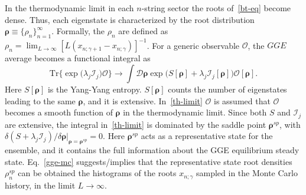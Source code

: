 \documentclass[twocolumn,superscriptaddress,prb,10pt]{revtex4-1}
\begin{document}
In the thermodynamic limit in each $n$-string sector the roots of~\eqref{bt-eq} become 
dense. Thus, each eigenstate is characterized by the root distribution $\pmb{\rho}\equiv
\{\rho_n\}_{n=1}^\infty$. Formally, the $\rho_n$ are defined as $\rho_n=\lim_{L\to\infty}
[L(x_{n;\gamma+1}-x_{n;\gamma})]^{-1}$. For a generic observable ${\mathcal O}$, 
the $GGE$ average becomes a functional integral as 
%
\begin{equation}
\label{th-limit}
\textrm{Tr}\big\{\exp\big({\lambda_j{\mathcal I}_j}\big){\mathcal O}\big\}
\rightarrow\int{\mathcal D}\pmb{\rho}\exp\big(S[\pmb{\rho}]+
\lambda_j{\mathcal I}_j[\pmb{\rho}]\big){\mathcal O}[\pmb{\rho}].
\end{equation}
%
Here $S[\pmb{\rho}]$ is the Yang-Yang entropy. $S[\pmb{\rho}]$ counts the number of 
eigenstates leading to the same $\pmb{\rho}$, and it is extensive. In~\eqref{th-limit} 
${\mathcal O}$ is assumed that ${\mathcal O}$ becomes a smooth function of $\pmb{\rho}$ 
in the thermodynamic limit. Since both $S$ and ${\mathcal I}_j$ are extensive, the integral 
in~\eqref{th-limit} is dominated by the saddle point $\pmb{\rho}^{sp}$, with 
$\delta(S+\lambda_j{\mathcal I}_j)/\delta\pmb{\rho}|_{\pmb{\rho}=\pmb{\rho}^{sp}}=0$.
Here $\pmb{\rho}^{sp}$ acts as a representative state for the ensemble, and it 
contains the full information about the GGE equilibrium steady state. Eq.~\eqref{gge-mc} 
suggests/implies that the representative state root densities $\rho_n^{sp}$ can be obtained 
the histograms of the roots $x_{n;\gamma}$ sampled in the Monte Carlo history, in the limit 
$L\to\infty$.  
\end{document}
